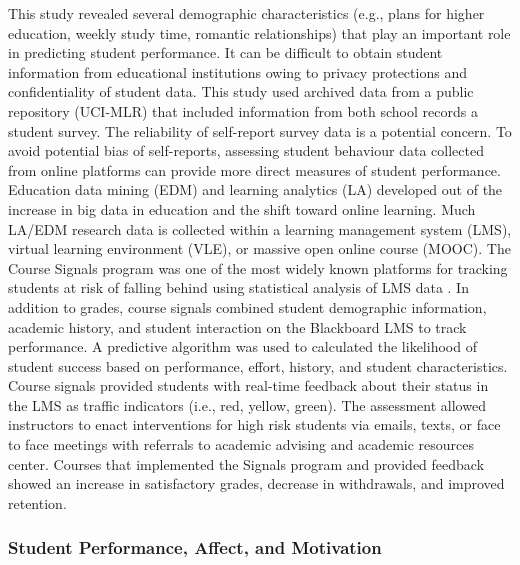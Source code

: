 \documentclass[sigconf]{acmart}
\begin{document}
This study revealed several demographic characteristics (e.g., plans for 
higher education, weekly study time, romantic relationships) that play an
important role in predicting student performance. It can be difficult to obtain 
student information from educational institutions owing to privacy protections 
and confidentiality of student data. This study used archived data from a 
public repository (UCI-MLR) that included information from both school records 
a student survey. The reliability of self-report survey data is a potential 
concern. To avoid potential bias of self-reports, assessing student behaviour 
data collected from online platforms can provide more direct measures of student
performance. Education data mining (EDM) and learning analytics (LA) developed 
out of the increase in big data in education and the shift toward online 
learning. Much LA/EDM research data is collected within a learning management 
system (LMS), virtual learning environment (VLE), or massive open online 
course (MOOC). The Course Signals program was one of the most widely known 
platforms for tracking students at risk of falling behind using statistical 
analysis of LMS data \cite{arnoldPistilli12}. In addition to grades, course
signals combined student demographic information, academic history, and student 
interaction on the Blackboard LMS to track performance. A predictive algorithm 
was used to calculated the likelihood of student success based on performance, 
effort, history, and student characteristics. Course signals provided students 
with real-time feedback about their status in the LMS as traffic indicators 
(i.e., red, yellow, green). The assessment allowed instructors to enact 
interventions for high risk students via emails, texts, or face to face 
meetings with referrals to academic advising and academic resources center.
Courses that implemented the Signals program and provided feedback showed an 
increase in satisfactory grades, decrease in withdrawals, and improved retention. 


\subsubsection{Student Performance, Affect, and Motivation}
\end{document}
